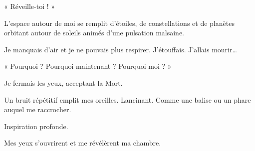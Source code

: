 « Réveille-toi ! »

L'espace autour de moi se remplit d'étoiles, de constellations et de planètes orbitant autour de soleils animés d'une 
pulsation malsaine.

Je manquais d'air et je ne pouvais plus respirer. J'étouffais. J'allais mourir…

« Pourquoi ? Pourquoi maintenant ? Pourquoi moi ? »

Je fermais les yeux, acceptant la Mort.

Un bruit répétitif emplit mes oreilles. Lancinant. Comme une balise ou un phare auquel me raccrocher.

Inspiration profonde.

Mes yeux s'ouvrirent et me révélèrent ma chambre.
